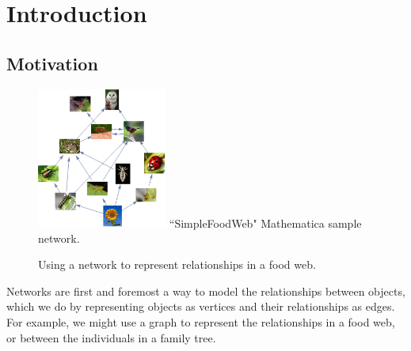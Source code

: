\documentclass[12pt]{thesis}
\theoremstyle{plain}
\theoremstyle{definition}
\theoremstyle{remark}
\begin{document}

\tableofcontents
\listoftables
\listoffigures
\mainmatter
















\chapter{Introduction}\label{chapter:introduction_and_background}

\section{Motivation}

\begin{figure}
\centering
\vspace{-15pt}
\includegraphics[width=0.38\textwidth]{foodweb.png}
\scriptsize
``SimpleFoodWeb" Mathematica sample network.
\caption{Using a network to represent relationships in a food web.}
\vspace{-15pt}
\label{fig:foodweb}
\end{figure}

Networks are first and foremost a way to model the relationships between objects, which we do by representing objects as vertices and their relationships as edges. For example, we might use a graph to represent the relationships in a food web, or between the individuals in a family tree.
\end{document}
